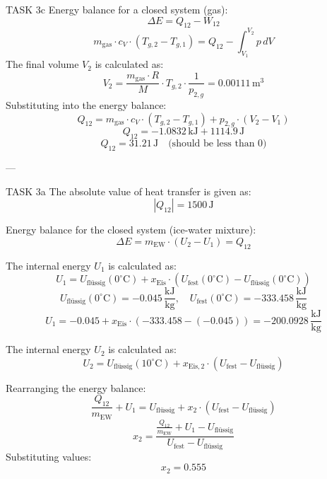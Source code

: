 TASK 3c  
Energy balance for a closed system (gas):  
\[
\Delta E = Q_{12} - W_{12}
\]  
\[
m_{\text{gas}} \cdot c_V \cdot (T_{g,2} - T_{g,1}) = Q_{12} - \int_{V_1}^{V_2} p \, dV
\]  
The final volume \( V_2 \) is calculated as:  
\[
V_2 = \frac{m_{\text{gas}} \cdot R}{M} \cdot T_{g,2} \cdot \frac{1}{p_{2,g}} = 0.00111 \, \text{m}^3
\]  
Substituting into the energy balance:  
\[
Q_{12} = m_{\text{gas}} \cdot c_V \cdot (T_{g,2} - T_{g,1}) + p_{2,g} \cdot (V_2 - V_1)
\]  
\[
Q_{12} = -1.0832 \, \text{kJ} + 1114.9 \, \text{J}
\]  
\[
Q_{12} = 31.21 \, \text{J} \quad \text{(should be less than 0)}
\]  

---

TASK 3a  
The absolute value of heat transfer is given as:  
\[
|Q_{12}| = 1500 \, \text{J}
\]  

Energy balance for the closed system (ice-water mixture):  
\[
\Delta E = m_{\text{EW}} \cdot (U_2 - U_1) = Q_{12}
\]  

The internal energy \( U_1 \) is calculated as:  
\[
U_1 = U_{\text{flüssig}}(0^\circ\text{C}) + x_{\text{Eis}} \cdot \left( U_{\text{fest}}(0^\circ\text{C}) - U_{\text{flüssig}}(0^\circ\text{C}) \right)
\]  
\[
U_{\text{flüssig}}(0^\circ\text{C}) = -0.045 \, \frac{\text{kJ}}{\text{kg}}, \quad U_{\text{fest}}(0^\circ\text{C}) = -333.458 \, \frac{\text{kJ}}{\text{kg}}
\]  
\[
U_1 = -0.045 + x_{\text{Eis}} \cdot (-333.458 - (-0.045)) = -200.0928 \, \frac{\text{kJ}}{\text{kg}}
\]  

The internal energy \( U_2 \) is calculated as:  
\[
U_2 = U_{\text{flüssig}}(10^\circ\text{C}) + x_{\text{Eis},2} \cdot \left( U_{\text{fest}} - U_{\text{flüssig}} \right)
\]  

Rearranging the energy balance:  
\[
\frac{Q_{12}}{m_{\text{EW}}} + U_1 = U_{\text{flüssig}} + x_2 \cdot (U_{\text{fest}} - U_{\text{flüssig}})
\]  
\[
x_2 = \frac{\frac{Q_{12}}{m_{\text{EW}}} + U_1 - U_{\text{flüssig}}}{U_{\text{fest}} - U_{\text{flüssig}}}
\]  
Substituting values:  
\[
x_2 = 0.555
\]  